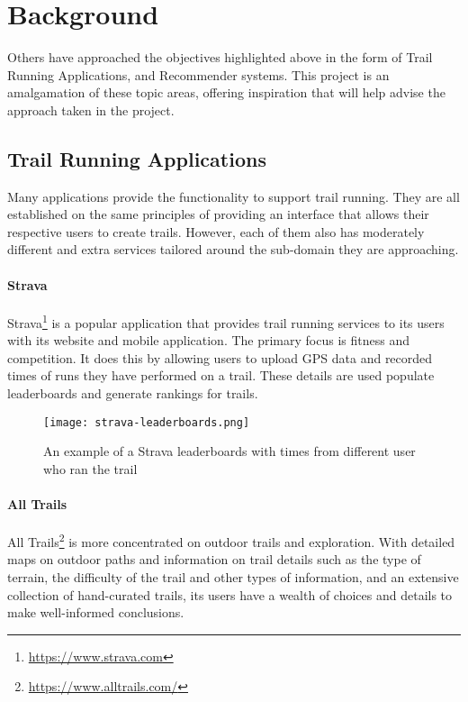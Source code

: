 \chapter{Background}
Others have approached the objectives highlighted above in the form of Trail Running Applications, and Recommender systems. This project is an amalgamation of these topic areas, offering inspiration that will help advise the approach taken in the project.

\section{Trail Running Applications} \label{sec:TrailRunningApplications}
Many applications provide the functionality to support trail running. They are all established on the same principles of providing an interface that allows their respective users to create trails. However, each of them also has moderately different and extra services tailored around the sub-domain they are approaching.

\subsubsection{Strava}
Strava\footnote{\url{https://www.strava.com}} is a popular application that provides trail running services to its users with its website and mobile application.  The primary focus is fitness and competition.  It does this by allowing users to upload GPS data and recorded times of runs they have performed on a trail.  These details are used populate leaderboards and generate rankings for trails.

\begin{figure}[ht]
    \centering
    \texttt{[image: strava-leaderboards.png]}
    \caption{An example of a Strava leaderboards with times from different user who ran the trail}
    \label{fig:stravaLeaderboards}
\end{figure}

\subsubsection{All Trails}
All Trails\footnote{\url{https://www.alltrails.com/}} is more concentrated on outdoor trails and exploration.  With detailed maps on outdoor paths and information on trail details such as the type of terrain, the difficulty of the trail and other types of information, and an extensive collection of hand-curated trails, its users have a wealth of choices and details to make well-informed conclusions.

